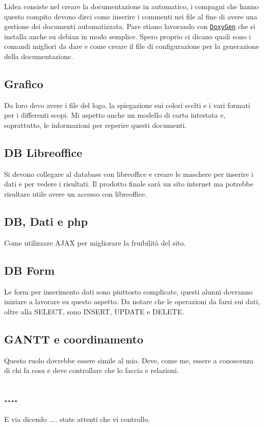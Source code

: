 L\textquotesingle{}idea consiste nel creare la documentazione in automatico, i compagni che hanno questo compito devono dirci come inserire i commenti nei file al fine di avere una gestione dei documenti automatizzata. Pare stiano lavorando con \href{http://doxygen.nl/}{\tt Doxy\+Gen} che si installa anche su debian in modo semplice. Spero proprio ci dicano quali sono i comandi migliori da dare e come creare il file di configurazione per la generazione della documentazione.

\subsection*{Grafico}

Da loro devo avere i file del logo, la spiegazione sui colori scelti e i vari formati per i differenti scopi. Mi aspetto anche un modello di carta intestata e, soprattutto, le informazioni per reperire questi documenti.

\subsection*{DB Libreoffice}

Si devono collegare al database con libreoffice e creare le maschere per inserire i dati e per vedere i risultati. Il prodotto finale sarà un sito internet ma potrebbe risultare utile avere un accesso con libreoffice.

\subsection*{DB, Dati e php}

Come utilizzare A\+J\+AX per migliorare la fruibilità del sito.

\subsection*{DB Form}

Le form per inserimento dati sono piuttosto complicate, questi alunni dovranno iniziare a lavorare su questo aspetto. Da notare che le operazioni da farsi sui dati, oltre alla S\+E\+L\+E\+CT, sono I\+N\+S\+E\+RT, U\+P\+D\+A\+TE e D\+E\+L\+E\+TE.

\subsection*{G\+A\+N\+TT e coordinamento}

Questo ruolo dovrebbe essere simile al mio. Deve, come me, essere a conoscenza di chi fa cosa e deve controllare che lo faccia e relazioni.

\subsection*{....}

E via dicendo .... state attenti che vi controllo. 